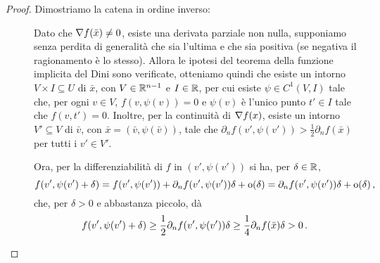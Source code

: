 \begin{proof}
	Dimostriamo la catena in ordine inverso:
	\begin{description}
		\item [] Dato che $\nabla f(\bar x)\neq 0$, esiste una derivata parziale non nulla, supponiamo senza perdita
			di generalità che sia l'ultima e che sia positiva (se negativa il ragionamento è lo stesso).
			Allora le ipotesi del teorema della funzione implicita del Dini sono verificate, otteniamo quindi
			che esiste un intorno $V\times I\subseteq U$ di $\bar x$, con $V\in\mathbb R^{n-1}$ e $I\in\mathbb R$, per cui esiste $\psi\in C^1(V,I)$ tale che, per ogni $v\in V$, $f(v,\psi(v))=0$ e $\psi(v)$
			è l'unico punto $t'\in I$ tale che $f(v,t')=0$.
			Inoltre, per la continuità di $\nabla f(x)$, esiste un intorno $V'\subseteq V$ di $\bar v$, con $\bar x=(\bar v, \psi(\bar v))$, tale che $\partial_n f(v',\psi(v'))>\frac{1}{2}
			\partial_n f(\bar x)$ per tutti i $v'\in V'$. 
			
			Ora, per la differenziabilità di $f$ in $(v',\psi(v'))$ si ha, per $\delta\in \mathbb R$,
			\[
				f(v',\psi(v')+\delta)=f(v', \psi(v'))+\partial_n f(v',\psi(v'))\delta+\mathrm{o}(\delta)=\partial_n f(v',\psi(v'))\delta+\mathrm{o}(\delta)\, \text{, }
			\]
			che, per $\delta>0$ e abbastanza piccolo, dà
			\begin{equation*}
				f(v',\psi(v')+\delta)\geq \frac{1}{2}\partial_n f(v',\psi(v'))\delta\geq \frac{1}{4}\partial_n f(\bar x)\delta>0\, \text{. }
			\end{equation*}
			

\end{description}
\end{proof}
